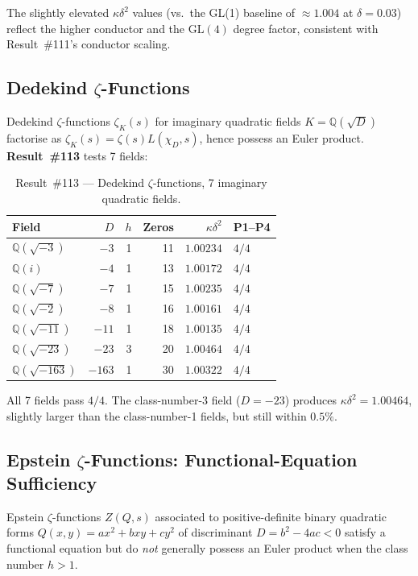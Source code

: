 \documentclass[11pt, a4paper]{article}
\theoremstyle{plain}
\theoremstyle{definition}
\begin{document}
The slightly elevated $\kappa\delta^{2}$ values (vs.\ the GL(1) baseline of
$\approx 1.004$ at $\delta=0.03$) reflect the higher conductor and the
$\mathrm{GL}(4)$ degree factor, consistent with Result~\#111's
conductor scaling.


\subsection{Dedekind $\zeta$-Functions}
\label{sec:dedekind}

Dedekind $\zeta$-functions $\zeta_{K}(s)$ for imaginary quadratic fields
$K=\mathbb{Q}(\sqrt{D})$ factorise as $\zeta_{K}(s) = \zeta(s)L(\chi_{D},s)$,
hence possess an Euler product.  \textbf{Result~\#113} tests 7 fields:

\begin{table}[ht]
\centering
\caption{Result~\#113 — Dedekind $\zeta$-functions, 7 imaginary quadratic fields.}
\label{tab:ded113}
\small
\begin{tabular}{lrrrrl}
\toprule
Field & $D$ & $h$ & Zeros & $\kappa\delta^{2}$ & P1--P4 \\
\midrule
$\mathbb{Q}(\sqrt{-3})$   & $-3$   & 1 & 11 & $1.00234$ & $4/4$ \\
$\mathbb{Q}(i)$           & $-4$   & 1 & 13 & $1.00172$ & $4/4$ \\
$\mathbb{Q}(\sqrt{-7})$   & $-7$   & 1 & 15 & $1.00235$ & $4/4$ \\
$\mathbb{Q}(\sqrt{-2})$   & $-8$   & 1 & 16 & $1.00161$ & $4/4$ \\
$\mathbb{Q}(\sqrt{-11})$  & $-11$  & 1 & 18 & $1.00135$ & $4/4$ \\
$\mathbb{Q}(\sqrt{-23})$  & $-23$  & 3 & 20 & $1.00464$ & $4/4$ \\
$\mathbb{Q}(\sqrt{-163})$ & $-163$ & 1 & 30 & $1.00322$ & $4/4$ \\
\bottomrule
\end{tabular}
\end{table}

All 7 fields pass $4/4$.  The class-number-3 field ($D=-23$) produces
$\kappa\delta^{2}=1.00464$, slightly larger than the class-number-1
fields, but still within $0.5\%$.


\subsection{Epstein $\zeta$-Functions: Functional-Equation Sufficiency}
\label{sec:epstein}
\label{ssec:thm6}

Epstein $\zeta$-functions $Z(Q,s)$ associated to positive-definite
binary quadratic forms $Q(x,y)=ax^{2}+bxy+cy^{2}$ of discriminant
$D=b^{2}-4ac<0$ satisfy a functional equation but do \emph{not}
generally possess an Euler product when the class number $h>1$.
\end{document}
